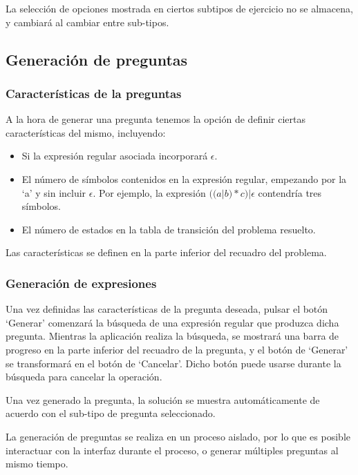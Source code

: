 La selección de opciones mostrada en ciertos subtipos de ejercicio no se almacena, y cambiará al cambiar entre sub-tipos.

\subsection{Generación de preguntas}

\subsubsection{Características de la preguntas}
A la hora de generar una pregunta tenemos la opción de definir ciertas características del mismo, incluyendo:
\begin{itemize}
	\item Si la expresión regular asociada incorporará $ \epsilon $.
	\item El número de símbolos contenidos en la expresión regular, empezando por la `a' y sin incluir $ \epsilon $.
	Por ejemplo, la expresión $ ((a|b)*c)|\epsilon $ contendría tres símbolos.
	\item El número de estados en la tabla de transición del problema resuelto.
\end{itemize}
Las características se definen en la parte inferior del recuadro del problema.


\subsubsection{Generación de expresiones}
Una vez definidas las características de la pregunta deseada, pulsar el botón `Generar' comenzará la búsqueda de una expresión regular que produzca dicha pregunta.
Mientras la aplicación realiza la búsqueda, se mostrará una barra de progreso en la parte inferior del recuadro de la pregunta, y el botón de `Generar' se transformará en el botón de `Cancelar'.
Dicho botón puede usarse durante la búsqueda para cancelar la operación.


Una vez generado la pregunta, la solución se muestra automáticamente de acuerdo con el sub-tipo de pregunta seleccionado.

La generación de preguntas se realiza en un proceso aislado, por lo que es posible interactuar con la interfaz durante el proceso, o generar múltiples preguntas al mismo tiempo.

